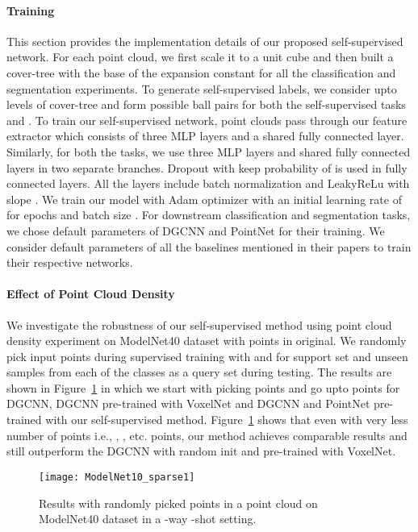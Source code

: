 \documentclass{article}
\begin{document}
\paragraph{Training}
This section provides the implementation details of our proposed self-supervised network. For each point cloud, we first scale it to a unit cube and then built a cover-tree with the base of the expansion constant  for all the classification and segmentation experiments. To generate self-supervised labels, we consider upto  levels of cover-tree and form possible ball pairs for both the self-supervised tasks  and . To train our self-supervised network, point clouds pass through our feature extractor which consists of three MLP layers  and a shared fully connected layer. Similarly, for both the tasks, we use three MLP layers  and shared fully connected layers in two separate branches. Dropout with keep probability of  is used in fully connected layers. All the layers include batch normalization and LeakyReLu with slope . We train our model with Adam optimizer with an initial learning rate of  for  epochs and batch size . For downstream classification and segmentation tasks, we chose default parameters of DGCNN and PointNet for their training. We consider default parameters of all the baselines mentioned in their papers to train their respective networks.

\paragraph{Effect of Point Cloud Density}
We investigate the robustness of our self-supervised method using point cloud density experiment on ModelNet40 dataset with  points in original. We randomly pick input points during supervised training with  and  for support set  and  unseen samples from each of the  classes as a query set  during testing. The results are shown in Figure~\ref{fig:sparse} in which we start with picking  points and go upto  points for DGCNN, DGCNN pre-trained with VoxelNet and DGCNN and PointNet pre-trained with our self-supervised method. Figure~\ref{fig:sparse} shows that even with very less number of points i.e., , ,  etc. points, our method achieves comparable results and still outperform the DGCNN with random init and pre-trained with VoxelNet.
\begin{figure}[h]
\centering
	\texttt{[image: ModelNet10\_sparse1]}
	\caption{Results with randomly picked points in a point cloud on ModelNet40 dataset in a -way -shot setting.}
	\label{fig:sparse}
\end{figure}
\end{document}

